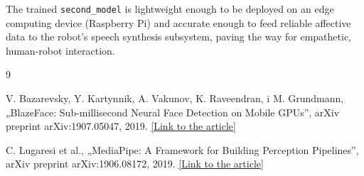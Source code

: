 \documentclass{article}
\begin{document}
The trained \texttt{second\_model} is lightweight enough to be deployed on an edge computing device (Raspberry Pi) and accurate enough to feed reliable affective data to the robot's speech synthesis subsystem, paving the way for empathetic, human-robot interaction.

\begin{thebibliography}{9}

    V. Bazarevsky, Y. Kartynnik, A. Vakunov, K. Raveendran, i M. Grundmann, „BlazeFace: Sub-millisecond Neural Face Detection on Mobile GPUs”, arXiv preprint arXiv:1907.05047, 2019. \href{https://arxiv.org/abs/1907.05047}{[Link to the article]} 
    
    C. Lugaresi et al., „MediaPipe: A Framework for Building Perception Pipelines”, arXiv preprint arXiv:1906.08172, 2019. \href{https://arxiv.org/abs/1906.08172}{[Link to the article]} 
    

\end{thebibliography}
\end{document}
